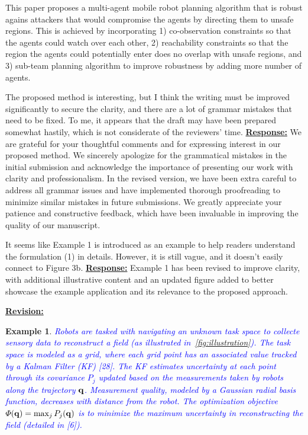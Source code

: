 \documentclass{article}
\newtheorem{example}{Example}
\newcommand{\rv}{{\large{\underline{\textbf{Revision:}}}}\quad}
\newcommand{\new}[1]{\textcolor{blue}{#1}}
\begin{document}
\begin{cmt*}{}{}

	This paper proposes a multi-agent mobile robot planning algorithm that
	is robust agains attackers that would compromise the agents by
	directing them to unsafe regions. This is achieved by incorporating 1)
	co-observation constraints so that the agents could watch over each
	other, 2) reachability constraints so that the region the agents could
	potentially enter does no overlap with unsafe regions, and 3) sub-team
	planning algorithm to improve robustness by adding more number of
	agents.
	
	The proposed method is interesting, but I think the writing must be
	improved significantly to secure the clarity, and there are a lot of
	grammar mistakes that need to be fixed. To me, it appears that the
	draft may have been prepared somewhat hastily, which is not considerate
	of the reviewers' time.
	\tcblower
	\underline{\textbf{Response:}} We are grateful for your thoughtful comments and for expressing interest in our proposed method. We sincerely apologize for the grammatical mistakes in the initial submission and acknowledge the importance of presenting our work with clarity and professionalism. In the revised version, we have been extra careful to address all grammar issues and have implemented thorough proofreading to minimize similar mistakes in future submissions. We greatly appreciate your patience and constructive feedback, which have been invaluable in improving the quality of our manuscript.

\end{cmt*}
\vspace{0.1cm}
\begin{cmt}{}{}        %
	It seems like Example 1 is introduced as an example to help
	readers understand the formulation (1) in details. However, it is still
	vague, and it doesn't easily connect to Figure 3b.
	\tcblower
	\underline{\textbf{Response:}} Example 1 has been revised to improve clarity, with additional illustrative content and an updated figure added to better showcase the example application and its relevance to the proposed approach.
\end{cmt}
\rv
\begin{example}\label{example:map_exploration}
\new{Robots are tasked with navigating an unknown task space to collecte sensory data to reconstruct a field (as illustrated in~\cref{fig:illustration}). The task space is modeled as a grid, where each grid point has an associated value tracked by a Kalman Filter (KF) [28]. The KF estimates uncertainty at each point through its covariance $P_j$ updated based on the measurements taken by robots along the trajectory $\mathbf{q}$. Measurement quality, modeled by a Gaussian radial basis function, decreases with distance from the robot. The optimization objective $\varPhi(\mathbf{q})=\max_j P_j(\mathbf{q})$ is to minimize the maximum uncertainty in reconstructing the field (detailed in [6]). }
\end{example}
\end{document}

